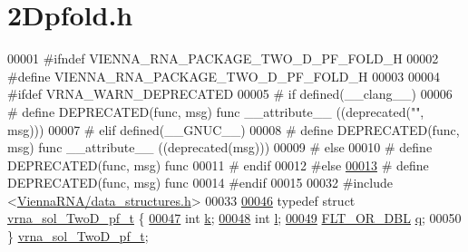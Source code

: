 \hypertarget{2_dpfold_8h_source}{}\section{2\+Dpfold.h}
\label{2_dpfold_8h_source}

\begin{DoxyCode}
00001 \textcolor{preprocessor}{#ifndef VIENNA\_RNA\_PACKAGE\_TWO\_D\_PF\_FOLD\_H}
00002 \textcolor{preprocessor}{#define VIENNA\_RNA\_PACKAGE\_TWO\_D\_PF\_FOLD\_H}
00003 
00004 \textcolor{preprocessor}{#ifdef VRNA\_WARN\_DEPRECATED}
00005 \textcolor{preprocessor}{# if defined(\_\_clang\_\_)}
00006 \textcolor{preprocessor}{#  define DEPRECATED(func, msg) func \_\_attribute\_\_ ((deprecated("", msg)))}
00007 \textcolor{preprocessor}{# elif defined(\_\_GNUC\_\_)}
00008 \textcolor{preprocessor}{#  define DEPRECATED(func, msg) func \_\_attribute\_\_ ((deprecated(msg)))}
00009 \textcolor{preprocessor}{# else}
00010 \textcolor{preprocessor}{#  define DEPRECATED(func, msg) func}
00011 \textcolor{preprocessor}{# endif}
00012 \textcolor{preprocessor}{#else}
\mbox{\hyperlink{2_dpfold_8h_aab347a3c03fbe8e7319551b9fa0cce4a}{00013}} \textcolor{preprocessor}{# define DEPRECATED(func, msg) func}
00014 \textcolor{preprocessor}{#endif}
00015 
00032 \textcolor{preprocessor}{#include <\mbox{\hyperlink{data__structures_8h}{ViennaRNA/data\_structures.h}}>}
00033 
\mbox{\hyperlink{group__kl__neighborhood__pf}{00046}} \textcolor{keyword}{typedef} \textcolor{keyword}{struct }\mbox{\hyperlink{group__kl__neighborhood__pf_structvrna__sol___two_d__pf__t}{vrna\_sol\_TwoD\_pf\_t}} \{
\mbox{\hyperlink{group__kl__neighborhood__pf_ad1f23b46dc4ebd373abdeb0382d87b83}{00047}}   \textcolor{keywordtype}{int}         \mbox{\hyperlink{group__kl__neighborhood__pf_ad1f23b46dc4ebd373abdeb0382d87b83}{k}};  
\mbox{\hyperlink{group__kl__neighborhood__pf_a01133c264eff2c988d144e07803d1b8b}{00048}}   \textcolor{keywordtype}{int}         \mbox{\hyperlink{group__kl__neighborhood__pf_a01133c264eff2c988d144e07803d1b8b}{l}};  
\mbox{\hyperlink{group__kl__neighborhood__pf_a17ebbf425b8769ded74b5c7b85e58ee1}{00049}}   \mbox{\hyperlink{group__data__structures_ga31125aeace516926bf7f251f759b6126}{FLT\_OR\_DBL}}  \mbox{\hyperlink{group__kl__neighborhood__pf_a17ebbf425b8769ded74b5c7b85e58ee1}{q}};  
00050 \} \mbox{\hyperlink{group__kl__neighborhood__pf_ga5e449fbd695406aabd2bcabddc374621}{vrna\_sol\_TwoD\_pf\_t}};

\end{DoxyCode}
